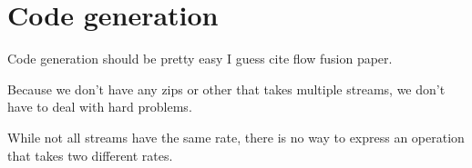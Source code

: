 \section{Code generation}
\label{s:Generation}

Code generation should be pretty easy I guess cite flow fusion paper.

Because we don't have any zips or other that takes multiple streams, we don't have to deal with hard problems.

While not all streams have the same rate, there is no way to express an operation that takes two different rates.

